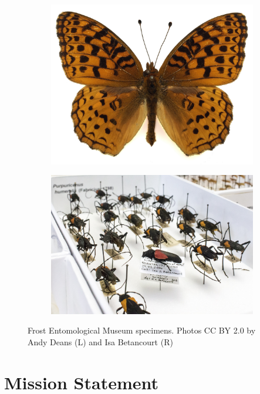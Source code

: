 \documentclass[letterpaper, 11pt]{article}
\begin{document}
\begin{figure}[ht!]
    \centering
    \begin{subfigure}[ht!]{0.43\textwidth}
        \includegraphics[width=\textwidth]{butterfly}
    \end{subfigure}
    \qquad
    \begin{subfigure}[ht!]{0.45\textwidth}
        \includegraphics[width=\textwidth]{pinned}
    \end{subfigure}
    \caption{Frost Entomological Museum specimens. Photos CC BY 2.0 by Andy Deans (L) and Isa Betancourt (R)}
\end{figure}

\section{Mission Statement}
\end{document}

